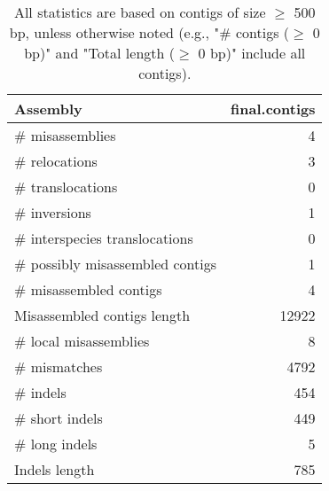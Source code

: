 \documentclass[12pt,a4paper]{article}
\begin{document}
\begin{table}[ht]
\begin{center}
\caption{All statistics are based on contigs of size $\geq$ 500 bp, unless otherwise noted (e.g., "\# contigs ($\geq$ 0 bp)" and "Total length ($\geq$ 0 bp)" include all contigs).}
\begin{tabular}{|l*{1}{|r}|}
\hline
Assembly & final.contigs \\ \hline
\# misassemblies & 4 \\ \hline
\hspace{5mm}\# relocations & 3 \\ \hline
\hspace{5mm}\# translocations & 0 \\ \hline
\hspace{5mm}\# inversions & 1 \\ \hline
\hspace{5mm}\# interspecies translocations & 0 \\ \hline
\# possibly misassembled contigs & 1 \\ \hline
\# misassembled contigs & 4 \\ \hline
Misassembled contigs length & 12922 \\ \hline
\# local misassemblies & 8 \\ \hline
\# mismatches & 4792 \\ \hline
\# indels & 454 \\ \hline
\hspace{5mm}\# short indels & 449 \\ \hline
\hspace{5mm}\# long indels & 5 \\ \hline
Indels length & 785 \\ \hline
\end{tabular}
\end{center}
\end{table}
\end{document}

